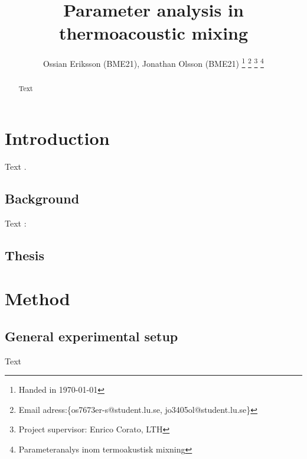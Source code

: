\documentclass[twoside,twocolumn,9pt,a4paper]{IEEEtran}
\begin{document}
\title{Parameter analysis in thermoacoustic mixing}
\author{
Ossian Eriksson (BME21), Jonathan Olsson (BME21)
\thanks{Handed in \today}
\thanks{Email adress:\{os7673er-s@student.lu.se, jo3405ol@student.lu.se\}}
\thanks{Project supervisor: Enrico Corato, LTH}
\thanks{Parameteranalys inom termoakustisk mixning} %
}
\maketitle


\begin{abstract}
Text
\end{abstract}


\section{Introduction} \label{secIntroduction}

Text \cite{Ward}.

\subsection{Background}

Text \cite{Bruus}:

\subsection{Thesis}

\section{Method} \label{secAfibMethods}

\subsection{General experimental setup}

Text
\end{document}
